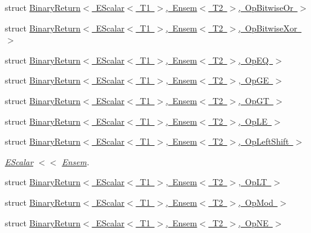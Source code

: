 \begin{DoxyCompactItemize}
\item 
struct \mbox{\hyperlink{structENSEM_1_1BinaryReturn_3_01EScalar_3_01T1_01_4_00_01Ensem_3_01T2_01_4_00_01OpBitwiseOr_01_4}{Binary\+Return$<$ E\+Scalar$<$ T1 $>$, Ensem$<$ T2 $>$, Op\+Bitwise\+Or $>$}}
\item 
struct \mbox{\hyperlink{structENSEM_1_1BinaryReturn_3_01EScalar_3_01T1_01_4_00_01Ensem_3_01T2_01_4_00_01OpBitwiseXor_01_4}{Binary\+Return$<$ E\+Scalar$<$ T1 $>$, Ensem$<$ T2 $>$, Op\+Bitwise\+Xor $>$}}
\item 
struct \mbox{\hyperlink{structENSEM_1_1BinaryReturn_3_01EScalar_3_01T1_01_4_00_01Ensem_3_01T2_01_4_00_01OpEQ_01_4}{Binary\+Return$<$ E\+Scalar$<$ T1 $>$, Ensem$<$ T2 $>$, Op\+E\+Q $>$}}
\item 
struct \mbox{\hyperlink{structENSEM_1_1BinaryReturn_3_01EScalar_3_01T1_01_4_00_01Ensem_3_01T2_01_4_00_01OpGE_01_4}{Binary\+Return$<$ E\+Scalar$<$ T1 $>$, Ensem$<$ T2 $>$, Op\+G\+E $>$}}
\item 
struct \mbox{\hyperlink{structENSEM_1_1BinaryReturn_3_01EScalar_3_01T1_01_4_00_01Ensem_3_01T2_01_4_00_01OpGT_01_4}{Binary\+Return$<$ E\+Scalar$<$ T1 $>$, Ensem$<$ T2 $>$, Op\+G\+T $>$}}
\item 
struct \mbox{\hyperlink{structENSEM_1_1BinaryReturn_3_01EScalar_3_01T1_01_4_00_01Ensem_3_01T2_01_4_00_01OpLE_01_4}{Binary\+Return$<$ E\+Scalar$<$ T1 $>$, Ensem$<$ T2 $>$, Op\+L\+E $>$}}
\item 
struct \mbox{\hyperlink{structENSEM_1_1BinaryReturn_3_01EScalar_3_01T1_01_4_00_01Ensem_3_01T2_01_4_00_01OpLeftShift_01_4}{Binary\+Return$<$ E\+Scalar$<$ T1 $>$, Ensem$<$ T2 $>$, Op\+Left\+Shift $>$}}
\begin{DoxyCompactList}\small\item\em \mbox{\hyperlink{classENSEM_1_1EScalar}{E\+Scalar}} $<$$<$ \mbox{\hyperlink{classENSEM_1_1Ensem}{Ensem}}. \end{DoxyCompactList}\item 
struct \mbox{\hyperlink{structENSEM_1_1BinaryReturn_3_01EScalar_3_01T1_01_4_00_01Ensem_3_01T2_01_4_00_01OpLT_01_4}{Binary\+Return$<$ E\+Scalar$<$ T1 $>$, Ensem$<$ T2 $>$, Op\+L\+T $>$}}
\item 
struct \mbox{\hyperlink{structENSEM_1_1BinaryReturn_3_01EScalar_3_01T1_01_4_00_01Ensem_3_01T2_01_4_00_01OpMod_01_4}{Binary\+Return$<$ E\+Scalar$<$ T1 $>$, Ensem$<$ T2 $>$, Op\+Mod $>$}}
\item 
struct \mbox{\hyperlink{structENSEM_1_1BinaryReturn_3_01EScalar_3_01T1_01_4_00_01Ensem_3_01T2_01_4_00_01OpNE_01_4}{Binary\+Return$<$ E\+Scalar$<$ T1 $>$, Ensem$<$ T2 $>$, Op\+N\+E $>$}}

\end{DoxyCompactItemize}
